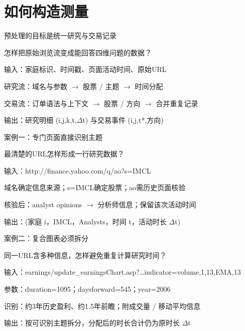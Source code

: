 \documentclass[11pt,compress]{beamer}
\begin{document}
\section{如何构造测量}
\begin{frame}{预处理的目标是统一研究与交易记录}\relax
{\small\color{tsinghua}怎样把原始浏览流变成能回答四维问题的数据？\par}\medskip
输入：家庭标识、时间戳、页面活动时间、原始URL\par\medskip
研究流：域名与参数 \(\rightarrow\) 股票 / 主题 \(\rightarrow\) 时间分配\par\medskip
交易流：订单语法与上下文 \(\rightarrow\) 股票 / 方向 \(\rightarrow\) 合并重复记录\par\medskip
输出：研究明细 (i,j,k,t,\(\Delta\)t) 与交易事件 (i,j,t*,方向)\par\medskip
{}
\end{frame}
\begin{frame}{案例一：专门页面直接识别主题}\relax
{\small\color{tsinghua}最清楚的URL怎样形成一行研究数据？\par}\medskip
输入：http://finance.yahoo.com/q/ao?s=IMCL\par\medskip
域名确定信息来源；s=IMCL确定股票；ao需历史页面核验\par\medskip
核验后：analyst opinions \(\rightarrow\) 分析师信息；保留该次活动时间\par\medskip
输出：(家庭 i，IMCL，Analysts，时间 t，活动时长 \(\Delta\)t)\par\medskip
{}
\end{frame}
\begin{frame}{案例二：复合图表必须拆分}\relax
{\small\color{tsinghua}同一URL含多种信息，怎样避免重复计算研究时间？\par}\medskip
输入：earnings/update\_earningsChart.asp?…indicator=volume,1,13,EMA,13\par\medskip
参数：duration=1095；daysforward=545；year=2006\par\medskip
识别：约3年历史盈利、约1.5年前瞻；附成交量 / 移动平均信息\par\medskip
输出：按可识别主题拆分，分配后的时长合计仍为原时长 \(\Delta\)t\par\medskip
{}
\end{frame}
\end{document}
